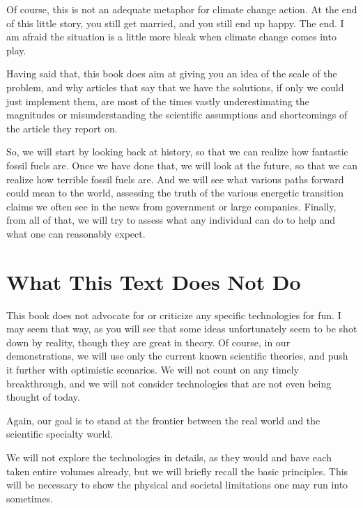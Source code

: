 Of course, this is not an adequate metaphor for climate change action. At the end of this little story, you still get married, and you still end up happy. The end. I am afraid the situation is a little more bleak when climate change comes into play.

Having said that, this book does aim at giving you an idea of the scale of the problem, and why articles that say that we have the solutions, if only we could just implement them, are most of the times vastly underestimating the magnitudes or misunderstanding the scientific assumptions and shortcomings of the article they report on.

So, we will start by looking back at history, so that we can realize how fantastic fossil fuels are. Once we have done that, we will look at the future, so that we can realize how terrible fossil fuels are. And we will see what various paths forward could mean to the world, assessing the truth of the various energetic transition claims we often see in the news from government or large companies. Finally, from all of that, we will try to assess what any individual can do to help and what one can reasonably expect.

\section{What This Text Does Not Do}

This book does not advocate for or criticize any specific technologies for fun. I may seem that way, as you will see that some ideas unfortunately seem to be shot down by reality, though they are great in theory. Of course, in our demonstrations, we will use only the current known scientific theories, and push it further with optimistic scenarios. We will not count on any timely breakthrough, and we will not consider technologies that are not even being thought of today.

Again, our goal is to stand at the frontier between the real world  and the scientific specialty world.

We will not explore the technologies in details, as they would and have each taken entire volumes already, but we will briefly recall the basic principles. This will be necessary to show the physical and societal limitations one may run into sometimes. 



